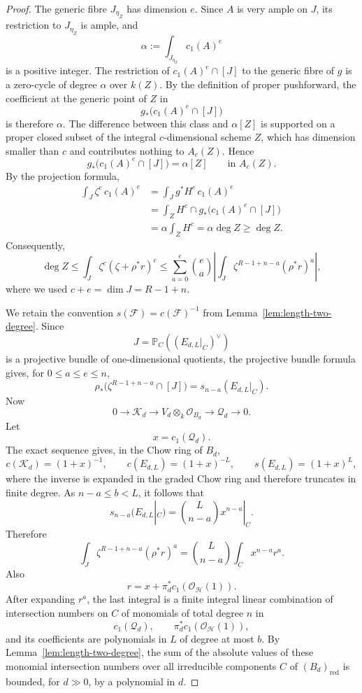 \documentclass{lms}
\newcommand{\PP}{\mathbb P}
\newcommand{\OO}{\mathcal O}
\begin{document}
\begin{proof}
The generic fibre $J_{\eta_Z}$ has dimension $e$.  Since $A$ is very ample on $J$, its restriction to $J_{\eta_Z}$ is ample, and
\[
        \alpha:=\int_{J_{\eta_Z}}c_1(A)^e
\]
is a positive integer.  The restriction of $c_1(A)^e\cap[J]$ to the generic fibre of $g$ is a zero-cycle of degree $\alpha$ over $k(Z)$.  By the definition of proper pushforward, the coefficient at the generic point of $Z$ in
\[
        g_*\bigl(c_1(A)^e\cap[J]\bigr)
\]
is therefore $\alpha$.  The difference between this class and $\alpha[Z]$ is supported on a proper closed subset of the integral $c$-dimensional scheme $Z$, which has dimension smaller than $c$ and contributes nothing to $A_c(Z)$.  Hence
\[
        g_*\bigl(c_1(A)^e\cap[J]\bigr)=\alpha[Z]
        \qquad\text{in }A_c(Z).
\]
By the projection formula,
\[
\begin{aligned}
        \int_J \zeta^c\,c_1(A)^e
        &=
        \int_J g^*H^c\,c_1(A)^e                                      \\
        &=
        \int_Z H^c\cap g_*\bigl(c_1(A)^e\cap[J]\bigr)                \\
        &=
        \alpha\int_Z H^c
        =\alpha\deg Z
        \ge \deg Z.
\end{aligned}
\]
Consequently,
\[
        \deg Z
        \le
        \int_J \zeta^c(\zeta+\rho^*r)^e
        \le
        \sum_{a=0}^{e}\binom ea
        \left|
        \int_J
        \zeta^{R-1+n-a}(\rho^*r)^a
        \right|,
\]
where we used $c+e=\dim J=R-1+n$.

We retain the convention $s(\mathcal F)=c(\mathcal F)^{-1}$ from Lemma~\ref{lem:length-two-degree}.  Since
\[
        J=\PP_C((E_{d,L}|_C)^\vee)
\]
is a projective bundle of one-dimensional quotients, the projective bundle formula gives, for $0\le a\le e\le n$,
\[
        \rho_*\bigl(\zeta^{R-1+n-a}\cap[J]\bigr)
        =s_{n-a}(E_{d,L}|_C).
\]
Now
\[
        0\to \mathcal K_d
        \to V_d\otimes_k\OO_{B_d}
        \to \mathcal Q_d
        \to0.
\]
Let
\[
        x=c_1(\mathcal Q_d).
\]
The exact sequence gives, in the Chow ring of $B_d$,
\[
        c(\mathcal K_d)=(1+x)^{-1},
        \qquad
        c(E_{d,L})=(1+x)^{-L},
        \qquad
        s(E_{d,L})=(1+x)^L,
\]
where the inverse is expanded in the graded Chow ring and therefore truncates in finite degree.
As $n-a\le b<L$, it follows that
\[
        s_{n-a}(E_{d,L}|_C)=\binom{L}{n-a}x^{n-a}|_C.
\]
Therefore
\[
        \int_J
        \zeta^{R-1+n-a}(\rho^*r)^a
        =
        \binom{L}{n-a}\int_C x^{n-a}r^a.
\]
Also
\[
        r=x+\pi_d^*c_1(\OO_{\mathcal H}(1)).
\]
After expanding $r^a$, the last integral is a finite integral linear combination of intersection numbers on $C$ of monomials of total degree $n$ in
\[
        c_1(\mathcal Q_d),
        \qquad
        \pi_d^*c_1(\OO_{\mathcal H}(1)),
\]
and its coefficients are polynomials in $L$ of degree at most $b$.  By Lemma~\ref{lem:length-two-degree}, the sum of the absolute values of these monomial intersection numbers over all irreducible components $C$ of $(B_d)_{\mathrm{red}}$ is bounded, for $d\gg0$, by a polynomial in $d$.


\end{proof}
\end{document}
